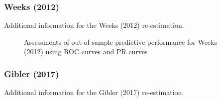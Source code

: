 \subsubsection*{Weeks (2012)}

Additional information for the Weeks (2012) re-estimation. 


\FloatBarrier

\begin{figure}
\centering   
  \caption{Assessments of out-of-sample predictive performance for Weeks (2012) using ROC curves and PR curves}
\end{figure}
\FloatBarrier
\clearpage

\subsubsection*{Gibler (2017)}

Additional information for the Gibler (2017) re-estimation. 


\FloatBarrier

